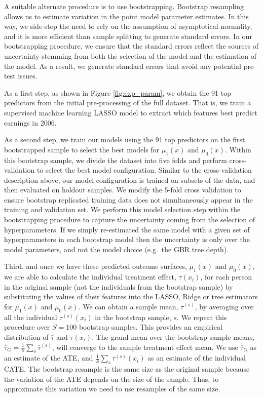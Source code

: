 \documentclass[12pt, a4paper]{article}
\begin{document}
A suitable alternate procedure is to use bootstrapping. Bootstrap resampling
allows us to estimate variation in the point model parameter estimates. In this
way, we side-step the need to rely on the assumption of asymptotical normality,
and it is more efficient than sample splitting to generate standard errors. In
our bootstrapping procedure, we ensure that the standard errors reflect the
sources of uncertainty stemming from both the selection of the model and the
estimation of the model. As a result, we generate standard errors that avoid
any potential pre-test issues.

As a first step, as shown in Figure \ref{fig:exp_param}, we obtain the 91 top
predictors from the initial pre-processing of the full dataset. That is, we
train a supervised machine learning LASSO model to extract which features best
predict earnings in 2006.

As a second step, we train our models using the 91 top predictors on the first
bootstrapped sample to select the best models for $\mu_1(x)$ and $\mu_0(x)$.
Within this bootstrap sample, we divide the dataset into five folds and perform
cross-validation to select the best model configuration. Similar to the
cross-validation description above, our model configuration is trained on
subsets of the data, and then evaluated on holdout samples. We modify the
5-fold cross validation to ensure bootstrap replicated training data does not
simultaneously appear in the training and validation set. We perform this model
selection step within the bootstrapping procedure to capture the uncertainty
coming from the selection of hyperparameters. If we simply re-estimated the
same model with a given set of hyperparameters in each bootstrap model then the
uncertainty is only over the model parameters, and not the model choice
(e.g.~the GBR tree depth).

Third, and once we have these predicted outcome surfaces, $\mu_1(x)$ and
$\mu_0(x)$, we are able to calculate the individual treatment effect,
$\tau(x_i)$, for each person in the original sample (not the individuals from
the bootstrap sample) by substituting the values of their features into the
LASSO, Ridge or tree estimators for $\mu_1(x)$ and $\mu_0(x)$. We can obtain a
sample mean, $\bar{\tau}^{(s)}$, by averaging over all the individual
$\tau^{(s)}(x_i)$ in the bootstrap sample, $s$. We repeat this procedure over
$S=100$ bootstrap samples. This provides an empirical distribution of
$\bar{\tau}$ and $\tau(x_i)$. The grand mean over the bootstrap sample means,
$\bar{\tau}_G = \frac{1}{S} \sum_s \bar{\tau}^{(s)}$, will converge to the
sample treatment effect mean. We use $\bar{\tau}_G$ as an estimate of the ATE,
and $\frac{1}{S} \sum_s \tau^{(s)}(x_i)$ as an estimate of the individual CATE.
The bootstrap resample is the same size as the original sample because the
variation of the ATE depends on the size of the sample. Thus, to approximate
this variation we need to use resamples of the same size.
\end{document}
